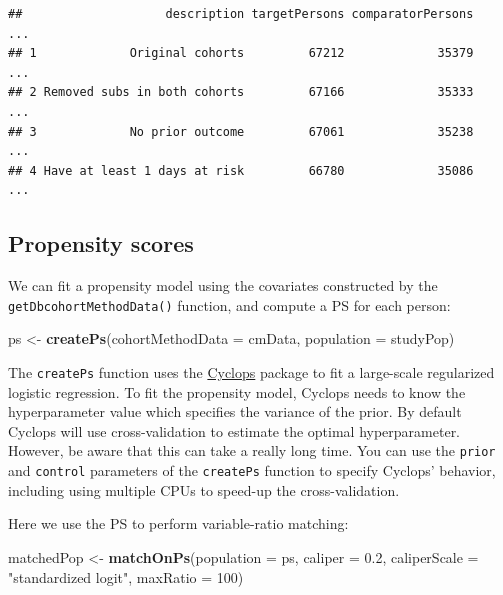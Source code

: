 \documentclass[11pt]{book}
\newenvironment{Shaded}{\begin{snugshade}}{\end{snugshade}}
\newcommand{\DataTypeTok}[1]{\textcolor[rgb]{0.13,0.29,0.53}{#1}}
\newcommand{\DecValTok}[1]{\textcolor[rgb]{0.00,0.00,0.81}{#1}}
\newcommand{\FloatTok}[1]{\textcolor[rgb]{0.00,0.00,0.81}{#1}}
\newcommand{\KeywordTok}[1]{\textcolor[rgb]{0.13,0.29,0.53}{\textbf{#1}}}
\newcommand{\NormalTok}[1]{#1}
\newcommand{\StringTok}[1]{\textcolor[rgb]{0.31,0.60,0.02}{#1}}
\theoremstyle{definition}
\theoremstyle{definition}
\theoremstyle{definition}
\theoremstyle{remark}
\begin{document}
\begin{verbatim}
##                    description targetPersons comparatorPersons   ...
## 1             Original cohorts         67212             35379   ...
## 2 Removed subs in both cohorts         67166             35333   ...
## 3             No prior outcome         67061             35238   ...
## 4 Have at least 1 days at risk         66780             35086   ...
\end{verbatim}

\hypertarget{propensity-scores-1}{%
\subsection{Propensity scores}\label{propensity-scores-1}}

We can fit a propensity model using the covariates constructed by the \texttt{getDbcohortMethodData()} function, and compute a PS for each person:

\begin{Shaded}
\begin{Highlighting}[]
\NormalTok{ps <-}\StringTok{ }\KeywordTok{createPs}\NormalTok{(}\DataTypeTok{cohortMethodData =}\NormalTok{ cmData, }\DataTypeTok{population =}\NormalTok{ studyPop)}
\end{Highlighting}
\end{Shaded}

The \texttt{createPs} function uses the \href{https://ohdsi.github.io/Cyclops/}{Cyclops} package to fit a large-scale regularized logistic regression. To fit the propensity model, Cyclops needs to know the hyperparameter value which specifies the variance of the prior. By default Cyclops will use cross-validation to estimate the optimal hyperparameter. However, be aware that this can take a really long time. You can use the \texttt{prior} and \texttt{control} parameters of the \texttt{createPs} function to specify Cyclops' behavior, including using multiple CPUs to speed-up the cross-validation.

Here we use the PS to perform variable-ratio matching:

\begin{Shaded}
\begin{Highlighting}[]
\NormalTok{matchedPop <-}\StringTok{ }\KeywordTok{matchOnPs}\NormalTok{(}\DataTypeTok{population =}\NormalTok{ ps, }\DataTypeTok{caliper =} \FloatTok{0.2}\NormalTok{,}
                        \DataTypeTok{caliperScale =} \StringTok{"standardized logit"}\NormalTok{, }\DataTypeTok{maxRatio =} \DecValTok{100}\NormalTok{)}
\end{Highlighting}
\end{Shaded}
\end{document}
